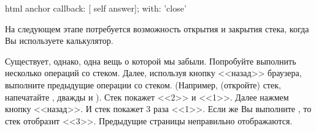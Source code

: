 \documentclass[a4paper,10pt,twoside]{book}
\begin{document}


\begin{code}{}
html anchor
	callback: [ self answer];
	with: 'close'
\end{code}


На следующем этапе потребуется возможность открытия и закрытия стека,
когда Вы используете калькулятор.


Существует, однако, одна вещь о которой мы забыли.
Попробуйте выполнить несколько операций со стеком.
Далее, используя кнопку <<назад>> браузера, выполните
предыдущие операции со стеком.
(Например,  (откройте) стек, напечатайте ,
 дважды
и \menu{+}). Стек покажет <<2>> и <<1>>. Далее нажмем кнопку
<<назад>>. И стек покажет 3 раза <<1>>. Если же Вы выполните \menu{+},
то стек отобразит <<3>>. Предыдущие страницы неправильно
отображаются.


\end{document}
